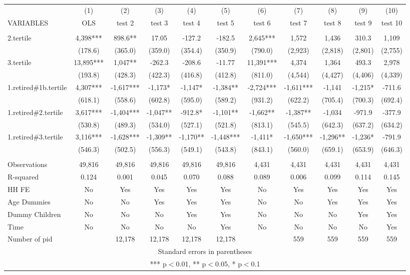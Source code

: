 \begin{tabular}{lcccccccccc} \hline
 & (1) & (2) & (3) & (4) & (5) & (6) & (7) & (8) & (9) & (10) \\
VARIABLES & OLS & test 2 & test 3 & test 4 & test 5 & test 6 & test 7 & test 8 & test 9 & test 10 \\ \hline
 &  &  &  &  &  &  &  &  &  &  \\
2.tertile & 4,398*** & 898.6** & 17.05 & -127.2 & -182.5 & 2,645*** & 1,572 & 1,436 & 310.3 & 1,109 \\
 & (178.6) & (365.0) & (359.0) & (354.4) & (350.9) & (790.0) & (2,923) & (2,818) & (2,801) & (2,755) \\
3.tertile & 13,895*** & 1,047** & -262.3 & -208.6 & -11.77 & 11,391*** & 4,374 & 1,364 & 493.3 & 2,978 \\
 & (193.8) & (428.3) & (422.3) & (416.8) & (412.8) & (811.0) & (4,544) & (4,427) & (4,406) & (4,339) \\
1.retired\#1b.tertile & 4,307*** & -1,617*** & -1,173* & -1,147* & -1,384** & -2,724*** & -1,611*** & -1,141 & -1,215* & -711.6 \\
 & (618.1) & (558.6) & (602.8) & (595.0) & (589.2) & (931.2) & (622.2) & (705.4) & (700.3) & (692.4) \\
1.retired\#2.tertile & 3,617*** & -1,404*** & -1,047** & -912.8* & -1,101** & -1,662** & -1,387** & -1,034 & -971.9 & -377.9 \\
 & (530.8) & (489.3) & (534.0) & (527.1) & (521.8) & (813.1) & (545.5) & (642.3) & (637.2) & (634.2) \\
1.retired\#3.tertile & 3,116*** & -1,628*** & -1,309** & -1,170** & -1,448*** & -1,411* & -1,650*** & -1,296** & -1,236* & -791.9 \\
 & (546.3) & (502.5) & (556.3) & (549.1) & (543.8) & (843.1) & (560.0) & (659.1) & (653.9) & (646.3) \\
 &  &  &  &  &  &  &  &  &  &  \\
Observations & 49,816 & 49,816 & 49,816 & 49,816 & 49,816 & 4,431 & 4,431 & 4,431 & 4,431 & 4,431 \\
R-squared & 0.124 & 0.001 & 0.045 & 0.070 & 0.088 & 0.089 & 0.006 & 0.099 & 0.114 & 0.145 \\
HH FE & No & Yes & Yes & Yes & Yes & No & Yes & Yes & Yes & Yes \\
Age Dummies & No & No & Yes & Yes & Yes & No & No & Yes & Yes & Yes \\
Dummy Children & No & No & No & Yes & Yes & No & No & No & Yes & Yes \\
Time & No & No & No & No & Yes & No & No & No & No & Yes \\
 Number of pid &  & 12,178 & 12,178 & 12,178 & 12,178 &  & 559 & 559 & 559 & 559 \\ \hline
\multicolumn{11}{c}{ Standard errors in parentheses} \\
\multicolumn{11}{c}{ *** p$<$0.01, ** p$<$0.05, * p$<$0.1} \\
\end{tabular}
